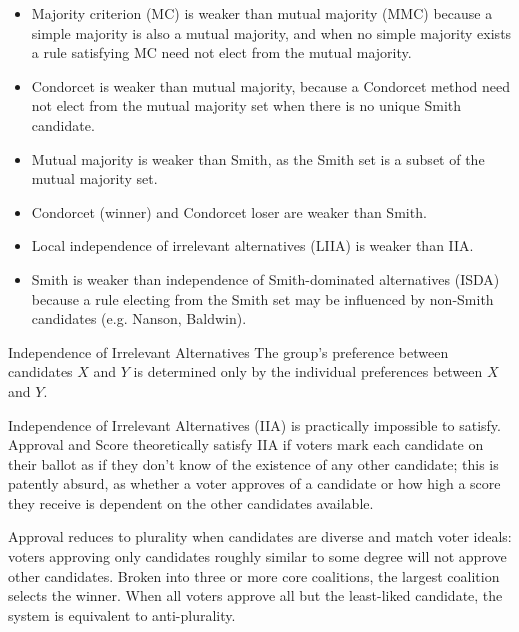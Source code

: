 \begin{itemize}
    \item Majority criterion (MC) is weaker than mutual majority (MMC) because a simple majority is also a mutual majority, and when no simple majority exists a rule satisfying MC need not elect from the mutual majority.

    \item Condorcet is weaker than mutual majority, because a Condorcet method need not elect from the mutual majority set when there is no unique Smith candidate.

    \item Mutual majority is weaker than Smith, as the Smith set is a subset of the mutual majority set.

    \item Condorcet (winner) and Condorcet loser are weaker than Smith.

    \item Local independence of irrelevant alternatives (LIIA) is weaker than IIA.

    \item Smith is weaker than independence of Smith-dominated alternatives (ISDA) because a rule electing from the Smith set may be influenced by non-Smith candidates (e.g. Nanson, Baldwin).

\end{itemize}

\begin{definition}{Independence of Irrelevant Alternatives}
    The group's preference between candidates $X$ and $Y$ is determined only by the individual preferences between $X$ and $Y$.
\end{definition}

Independence of Irrelevant Alternatives (IIA) is practically impossible to satisfy.  Approval and Score theoretically satisfy IIA if voters mark each candidate on their ballot as if they don't know of the existence of any other candidate; this is patently absurd, as whether a voter approves of a candidate or how high a score they receive is dependent on the other candidates available.

Approval reduces to plurality when candidates are diverse and match voter ideals:  voters approving only candidates roughly similar to some degree will not approve other candidates.  Broken into three or more core coalitions, the largest coalition selects the winner.  When all voters approve all but the least-liked candidate, the system is equivalent to anti-plurality.

